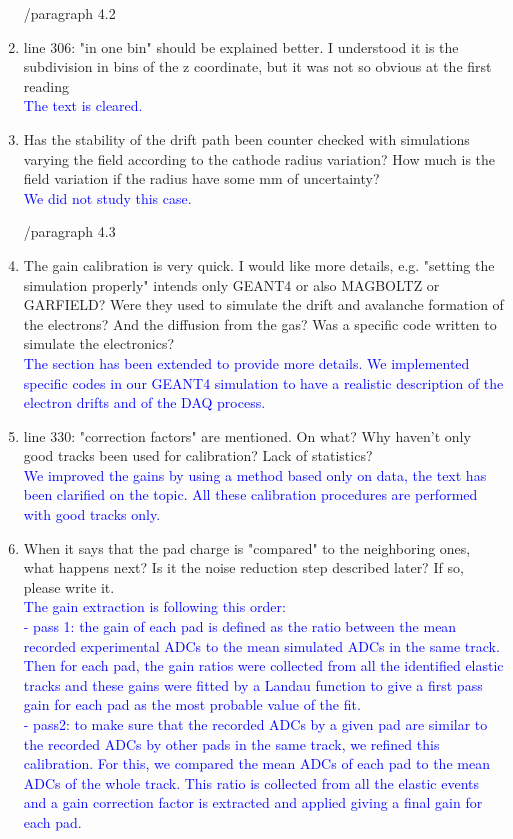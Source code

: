 \documentclass[a4paper,11pt,twoside]{article}
\begin{document}
\begin{enumerate}
        /paragraph 4.2

\item line 306: "in one bin" should be explained better. I understood it is the 
   subdivision in bins of the z coordinate, but it was not so obvious at the 
   first reading\\
\textcolor{blue}{The text is cleared.} 

\item Has the stability of the drift path been counter checked with simulations 
   varying the field according to the cathode radius variation? How much is the 
   field variation if the radius have some mm of uncertainty?\\
\textcolor{blue}{We did not study this case. } 

        /paragraph 4.3
\item The gain calibration is very quick. I would like more details, e.g. 
   "setting the simulation properly" intends only GEANT4 or also MAGBOLTZ or 
   GARFIELD? Were they used to simulate the drift and avalanche formation of 
   the electrons? And the diffusion from the gas? Was a specific code written 
   to simulate the electronics?\\
\textcolor{blue}{The section has been extended to provide more details. We 
implemented specific codes in our GEANT4 simulation to have a realistic 
description of the electron drifts and of the DAQ process.} 

\item line 330: "correction factors" are mentioned. On what? Why haven't only 
   good tracks been used for calibration? Lack of statistics?\\
\textcolor{blue}{We improved the gains by using a method based only on data,
the text has been clarified on the topic. All these calibration procedures
are performed with good tracks only.} 

\item When it says that the pad charge is "compared" to the neighboring ones, 
   what happens next? Is it the noise reduction step described later? If so, 
   please write it. \\
\textcolor{blue}{The gain extraction is following this order: \\
- pass 1: the gain of each pad is defined as the ratio between the mean 
recorded experimental ADCs to the mean simulated ADCs in the same track. Then 
for each pad, the gain ratios were collected from all the identified elastic 
tracks and these gains were fitted by a Landau function to give a
  first pass gain for each pad as the most probable value of the fit.\\
 - pass2: to make sure that the recorded ADCs by a given pad are similar to the 
 recorded ADCs by other pads in the same track, we refined this calibration. For this, 
 we compared the mean ADCs of each pad to the mean ADCs of the whole track. 
 This ratio is collected from all the elastic events and a gain correction 
 factor is extracted and applied giving a final gain for each pad.
  } 


\end{enumerate}
\end{document}
